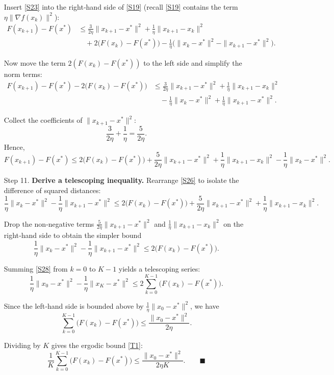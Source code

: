 \documentclass{article}
\begin{document}
\begin{enumerate}
Insert \eqref{S23} into the right‑hand side of \eqref{S19} (recall \eqref{S19} contains the term $\eta\|\nabla f(x_{k})\|^{2}$):
\[
\begin{aligned}
F(x_{k+1})-F(x^{*})
&\le \frac{3}{2\eta}\|x_{k+1}-x^{*}\|^{2}
   +\frac{1}{\eta}\|x_{k+1}-x_{k}\|^{2}\\
&\quad + 2\bigl(F(x_{k})-F(x^{*})\bigr)
   -\frac{1}{\eta}\bigl(\|x_{k}-x^{*}\|^{2}-\|x_{k+1}-x^{*}\|^{2}\bigr).
\end{aligned}
\tag{S24}
\]

Now move the term $2(F(x_{k})-F(x^{*}))$ to the left side and simplify the norm terms:
\[
\begin{aligned}
F(x_{k+1})-F(x^{*}) - 2\bigl(F(x_{k})-F(x^{*})\bigr)
&\le \frac{3}{2\eta}\|x_{k+1}-x^{*}\|^{2}
   +\frac{1}{\eta}\|x_{k+1}-x_{k}\|^{2}\\
&\quad -\frac{1}{\eta}\|x_{k}-x^{*}\|^{2}
   +\frac{1}{\eta}\|x_{k+1}-x^{*}\|^{2}.
\end{aligned}
\tag{S25}
\]

Collect the coefficients of $\|x_{k+1}-x^{*}\|^{2}$:
\[
\frac{3}{2\eta}+\frac{1}{\eta}= \frac{5}{2\eta}.
\]
Hence,
\[
F(x_{k+1})-F(x^{*}) \le
2\bigl(F(x_{k})-F(x^{*})\bigr)
+\frac{5}{2\eta}\|x_{k+1}-x^{*}\|^{2}
+\frac{1}{\eta}\|x_{k+1}-x_{k}\|^{2}
-\frac{1}{\eta}\|x_{k}-x^{*}\|^{2}.
\tag{S26}
\]

\item[Step 11.] \textbf{Derive a telescoping inequality.}
Rearrange \eqref{S26} to isolate the difference of squared distances:
\[
\frac{1}{\eta}\|x_{k}-x^{*}\|^{2}
-\frac{1}{\eta}\|x_{k+1}-x^{*}\|^{2}
\le 2\bigl(F(x_{k})-F(x^{*})\bigr)
   +\frac{5}{2\eta}\|x_{k+1}-x^{*}\|^{2}
   +\frac{1}{\eta}\|x_{k+1}-x_{k}\|^{2}.
\tag{S27}
\]

Drop the non‑negative terms $\frac{5}{2\eta}\|x_{k+1}-x^{*}\|^{2}$ and $\frac{1}{\eta}\|x_{k+1}-x_{k}\|^{2}$ on the right‑hand side to obtain the simpler bound
\[
\frac{1}{\eta}\|x_{k}-x^{*}\|^{2}
-\frac{1}{\eta}\|x_{k+1}-x^{*}\|^{2}
\le 2\bigl(F(x_{k})-F(x^{*})\bigr).
\tag{S28}
\]

Summing \eqref{S28} from $k=0$ to $K-1$ yields a telescoping series:
\[
\frac{1}{\eta}\|x_{0}-x^{*}\|^{2}
-\frac{1}{\eta}\|x_{K}-x^{*}\|^{2}
\le 2\sum_{k=0}^{K-1}\bigl(F(x_{k})-F(x^{*})\bigr).
\tag{S29}
\]

Since the left‑hand side is bounded above by $\frac{1}{\eta}\|x_{0}-x^{*}\|^{2}$, we have
\[
\sum_{k=0}^{K-1}\bigl(F(x_{k})-F(x^{*})\bigr)
\le \frac{\|x_{0}-x^{*}\|^{2}}{2\eta}.
\tag{S30}
\]

Dividing by $K$ gives the ergodic bound \eqref{T1}:
\[
\frac{1}{K}\sum_{k=0}^{K-1}\bigl(F(x_{k})-F(x^{*})\bigr)
\le \frac{\|x_{0}-x^{*}\|^{2}}{2\eta K}.
\qquad\blacksquare
\]

\end{enumerate}
\end{document}
